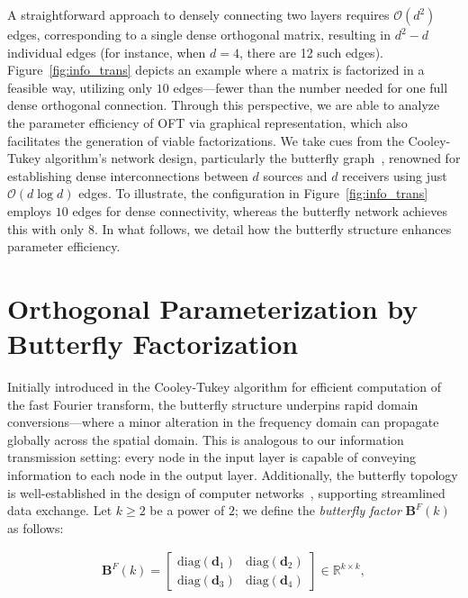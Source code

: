 A straightforward approach to densely connecting two layers requires $\mathcal{O}(d^2)$ edges, corresponding to a single dense orthogonal matrix, resulting in $d^2-d$ individual edges (for instance, when $d=4$, there are 12 such edges). Figure~\ref{fig:info_trans} depicts an example where a matrix is factorized in a feasible way, utilizing only $10$ edges—fewer than the number needed for one full dense orthogonal connection. Through this perspective, we are able to analyze the parameter efficiency of OFT via graphical representation, which also facilitates the generation of viable factorizations. We take cues from the Cooley-Tukey algorithm’s network design, particularly the butterfly graph~\cite{cooley1965algorithm}, renowned for establishing dense interconnections between $d$ sources and $d$ receivers using just $\mathcal{O}(d\log d)$ edges. To illustrate, the configuration in Figure~\ref{fig:info_trans} employs $10$ edges for dense connectivity, whereas the butterfly network achieves this with only $8$. In what follows, we detail how the butterfly structure enhances parameter efficiency.

\section{Orthogonal Parameterization by Butterfly Factorization}

Initially introduced in the Cooley-Tukey algorithm for efficient computation of the fast Fourier transform, the butterfly structure underpins rapid domain conversions—where a minor alteration in the frequency domain can propagate globally across the spatial domain. This is analogous to our information transmission setting: every node in the input layer is capable of conveying information to each node in the output layer. Additionally, the butterfly topology is well-established in the design of computer networks~\cite{solihin2015fundamentals,li2011linear}, supporting streamlined data exchange. Let $k \geq 2$ be a power of $2$; we define the \emph{butterfly factor} $\bm{B}^F(k)$ as follows:

\begin{equation}\label{eq:but_factor}
\begin{aligned}
    \bm{B}^F(k)=\begin{bmatrix}
    \text{diag}(\bm{d}_1) & \text{diag}(\bm{d}_2) \\
    \text{diag}(\bm{d}_3) & \text{diag}(\bm{d}_4)
    \end{bmatrix}\in\mathbb{R}^{k\times k},
\end{aligned}
\end{equation}

